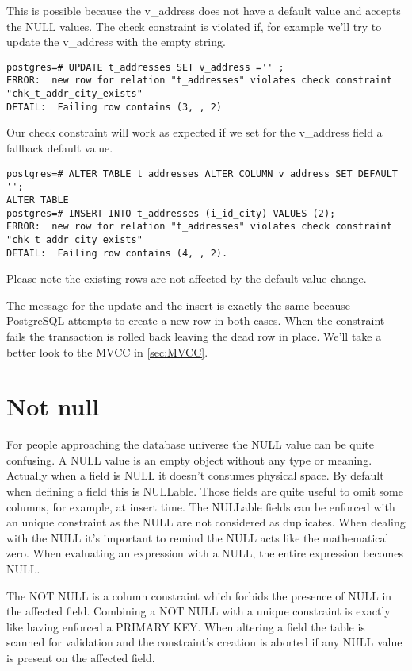 This is possible because the v\_address does not have a default value and accepts the NULL 
values. The check constraint is violated if, for example we'll try to update the v\_address with 
the empty string.

\begin{lstlisting}[style=pgsql]
postgres=# UPDATE t_addresses SET v_address ='' ;
ERROR:  new row for relation "t_addresses" violates check constraint "chk_t_addr_city_exists"
DETAIL:  Failing row contains (3, , 2)
\end{lstlisting}

Our check constraint will work as expected if we set for the v\_address field a fallback default 
value.

\begin{lstlisting}[style=pgsql]
postgres=# ALTER TABLE t_addresses ALTER COLUMN v_address SET DEFAULT '';
ALTER TABLE
postgres=# INSERT INTO t_addresses (i_id_city) VALUES (2);
ERROR:  new row for relation "t_addresses" violates check constraint "chk_t_addr_city_exists"
DETAIL:  Failing row contains (4, , 2).

\end{lstlisting}
Please note the existing rows are not affected by the default value change.

The message for the update and the insert is exactly the same because PostgreSQL attempts to create 
a new row in both cases. When the constraint fails the transaction is rolled back leaving the dead 
row in place. We'll take a better look to the MVCC in \ref{sec:MVCC}.


\section{Not null}
For people approaching the database universe the NULL value can be quite confusing. A NULL value is 
an empty object without any type or meaning. Actually when a field is NULL it doesn't consumes 
physical space. By default when defining a field this is NULLable. Those fields are quite useful to 
omit some columns, for example, at insert time.\newline
The NULLable fields can be enforced with an unique constraint as the NULL are not considered as 
duplicates. When dealing with the NULL it's important to remind the NULL acts like the mathematical 
zero. When evaluating an expression with a NULL, the entire expression becomes NULL.\newline

The NOT NULL is a column constraint which forbids the presence of NULL in the affected field. 
Combining a NOT NULL with a unique constraint is exactly like having enforced a PRIMARY KEY. When 
altering a field the table is scanned for validation and the constraint's creation is aborted if 
any NULL value is present on the affected field.\newline

